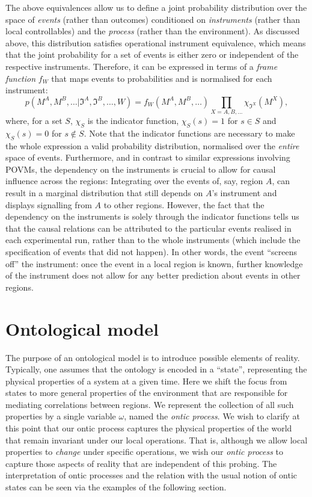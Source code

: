 \documentclass[a4paper,onecolumn,11pt,accepted=2018-05-04]{quantumarticle}
\begin{document}
The above equivalences allow us to define a joint probability distribution over the space of \emph{events} (rather than outcomes) conditioned on \emph{instruments} (rather than local controllables) and the \emph{process} (rather than the environment). As discussed above, this distribution satisfies operational instrument equivalence, which means that the joint probability for a set of events is either zero or independent of the respective instruments. Therefore, it can be expressed in terms of a \emph{frame function} $f_{W}$ that maps events to probabilities and is normalised for each instrument:
\begin{equation}
p(M^A, M^B,\dots|\mathfrak{I}^A, \mathfrak{I}^B,\dots, W) =  f_W(M^A, M^B,\dots) \prod_{X=A,B,\dots}  \chi_{\mathfrak{I}^X}(M^X),
\end{equation}
where, for a set $S$, $\chi_S$ is the indicator function, $\chi_S(s)=1$ for $s\in S$ and $\chi_S(s)=0$ for $s\not\in S$. Note that the indicator functions are necessary to make the whole expression a valid probability distribution, normalised over the \emph{entire} space of events. 
Furthermore, and in contrast to similar expressions involving POVMs, the dependency on the instruments is crucial to allow for causal influence across the regions: Integrating over the events of, say, region $A$, can result in a marginal distribution that still depends on $A$'s instrument and displays signalling from $A$ to other regions. However, the fact that the dependency on the instruments is solely through the indicator functions tells us that the causal relations can be attributed to the particular events realised in each experimental run, rather than to the whole instruments (which include the specification of events that did not happen). In other words, the event ``screens off'' the instrument: once the event in a local region is known, further knowledge of the instrument does not allow for any better prediction about events in other regions.



 \section{Ontological model}\label{ontModel}

The purpose of an ontological model is to introduce possible elements of reality. Typically, one assumes that the ontology is encoded in a ``state'', representing the physical properties of a system at a given time.  Here we shift the focus from states to more general properties of the environment that are responsible for mediating correlations between regions. We represent the collection of all such properties by a single variable $\omega$, named the \emph{ontic process}. We wish to clarify at this point that our ontic process captures the physical properties of the world that remain invariant under our local operations. That is, although we allow local properties to \emph{change} under specific operations, we wish our \emph{ontic process} to capture those aspects of reality that are independent of this probing. The interpretation of ontic processes and the relation with the usual notion of ontic states can be seen via the examples of the following section.
\end{document}
